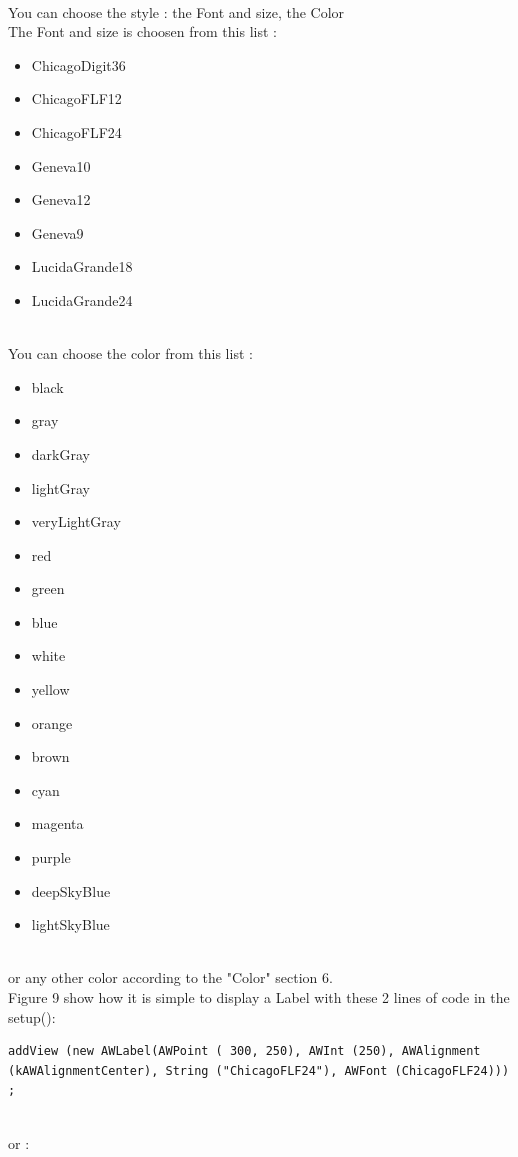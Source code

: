 \documentclass[a4paper,11pt]{extarticle}
\begin{document}
~\\ You can choose the style : the Font and size, the Color 
~\\ The Font and size is choosen from this list :
\begin{itemize}
\item ChicagoDigit36
\item ChicagoFLF12
\item ChicagoFLF24
\item Geneva10
\item Geneva12
\item Geneva9
\item LucidaGrande18
\item LucidaGrande24
\end{itemize}

~\\ You can choose the color from this list :
\begin{itemize}
\item black
\item gray
\item darkGray
\item lightGray
\item veryLightGray
\item red
\item green
\item blue
\item white
\item yellow
\item orange
\item brown
\item cyan
\item magenta
\item purple
\item deepSkyBlue
\item lightSkyBlue
\end{itemize}

~\\ or any other color according to the "Color" section 6.
~\\ Figure 9 show how it is simple to display a Label with these 2 lines of code in the setup():

\begin{lstlisting}[language=Arduinonl]
  addView (new AWLabel(AWPoint ( 300, 250), AWInt (250), AWAlignment (kAWAlignmentCenter), String ("ChicagoFLF24"), AWFont (ChicagoFLF24))) ;
\end{lstlisting}

~\\ or :
\end{document}
